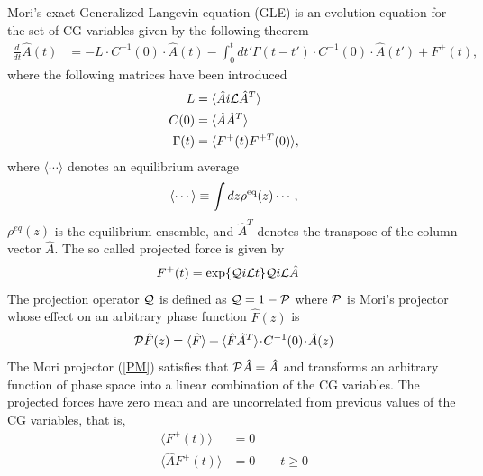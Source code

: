 \documentclass[b5paper,openright,10pt]{book}
\newcommand{\esc}{\!\cdot\!}
\begin{document}
Mori's  exact  Generalized Langevin  equation  (GLE)  is an  evolution
equation for the set of CG variables given by the following theorem\cite{Mori1965,Zwanzig2001,Kubo1991}
\begin{align}
\frac{d}{dt}\hat{A}(t) &= -L\esc C^{-1}(0)\esc \hat{A} (t)
-\int_0^tdt'\Gamma(t-t')\esc  C^{-1}(0)\esc \hat{A} (t') +F^+(t),
\label{exact}
\end{align}
where the following matrices have been introduced
\begin{align}
L&=\langle \hat{A}i{\cal L}\hat{A}^T\rangle
\nonumber\\
C(0)&=\langle \hat{A}\hat{A}^T\rangle
\nonumber\\
\Gamma(t)&=\langle F^+(t)F^{+T}(0)\rangle,
\label{def}
\end{align}
where  $\langle\cdots \rangle$
denotes an equilibrium average
\begin{equation}
\langle\cdots\rangle\equiv \int dz\rho^{\rm eq}(z)\cdots,
\label{esc}
\end{equation}
$\rho^{eq}(z)$ is  the  equilibrium  ensemble, and $\hat{A}^T$ denotes the transpose of the column vector $\hat{A}$.
The so called projected force is given by
\begin{align}
F^+(t)&= \exp\{{\cal Q}i{\cal L}t\} {\cal Q}i{\cal L}\hat{A}  
\label{Proj}
\end{align}
The projection operator ${\cal Q}$ is defined as ${\cal Q}=1-{\cal P}$
where  ${\cal P}$  is Mori's  projector whose  effect on  an arbitrary
phase function $\hat{F}(z)$ is
\begin{align}
  {\cal P}\hat{F}(z) = \langle \hat{F}\rangle+ \langle \hat{F}\hat{A}^T \rangle\esc  C^{-1}(0)\esc  \hat{A}(z)
\label{PM}
\end{align}
The  Mori  projector  (\ref{PM})   satisfies  that  ${\cal  P}\hat{A}=
\hat{A}$ and  transforms an arbitrary  function of phase space  into a
linear combination  of the  CG variables.   The projected  forces have
zero  mean  and  are  uncorrelated  from
previous values of the CG variables, that is, 
\begin{align}
\langle  F^+  (t)\rangle&=0  
\nonumber\\
\langle \hat{A} F^+ (t)\rangle&=0 \quad\quad t\ge 0
\end{align}
\end{document}
